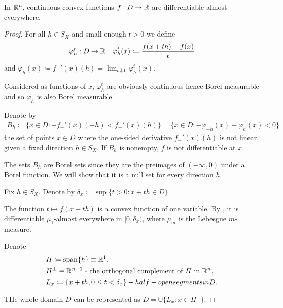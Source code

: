 \begin{theorem}\label{thm:rn_continuous_convex_frechet_almost_everywhere}\cite[exercise 1.17]{Phelps1993}
  In $\mathbb R^n$, continuous convex functions $f: D \to \mathbb R$ are differentiable almost everywhere.
\end{theorem}
\begin{proof}
  For all $h \in S_X$ and small enough $t > 0$ we define
  \begin{align*}
    &\varphi_h^t: D \to \mathbb R
    &\varphi_h^t(x) \coloneqq \frac {f(x + th) - f(x)} t
  \end{align*}
  and $\varphi_h(x) \coloneqq f_+'(x)(h) = \lim_{t \downarrow 0} \varphi_h^t(x)$.

  Considered as functions of $x$, $\varphi_h^t$ are obviously continuous hence Borel measurable and so $\varphi_h$ is also Borel measurable.

  Denote by
  \begin{align*}
    B_h
    \coloneqq
    \{ x \in D \colon -f_+'(x)(-h) < f_+'(x)(h) \}
    =
    \{ x \in D \colon -\varphi_{-h}(x) - \varphi_h(x) < 0 \}
  \end{align*}
  the set of points $x \in D$ where the one-sided derivative $f_+'(x)(h)$ is not linear, given a fixed direction $h \in S_X$. If $B_h$ is nonempty, $f$ is not differentiable at $x$.

  The sets $B_h$ are Borel sets since they are the preimages of $(-\infty, 0)$ under a Borel function. We will show that it is a null set for every direction $h$.

  Fix $h \in S_X$. Denote by $\delta_x \coloneqq \sup \{ t > 0 \colon x + th \in D \}$.

  The function $t \mapsto f(x + th)$ is a convex function of one variable. By \cite[theorem 1.16]{Phelps1993}, it is differentiable $\mu_1$-almost everywhere in $[0, \delta_x)$, where $\mu_m$ is the Lebesgue $m$-measure.

  Denote
  \begin{align*}
    &H \coloneqq \operatorname{span}\{ h \} \equiv \mathbb R^1,
    \\
    &H^\perp \equiv \mathbb R^{n-1} \text{ - the orthogonal complement of $H$ in $\mathbb R^n$},
    \\
    &L_x \coloneqq \{ x + th, 0 \leq t < \delta_x \} - half-open segments in D.
  \end{align*}

  THe whole domain $D$ can be represented as $D = \cup \{ L_x \colon x \in H^\perp \}$.


\end{proof}
